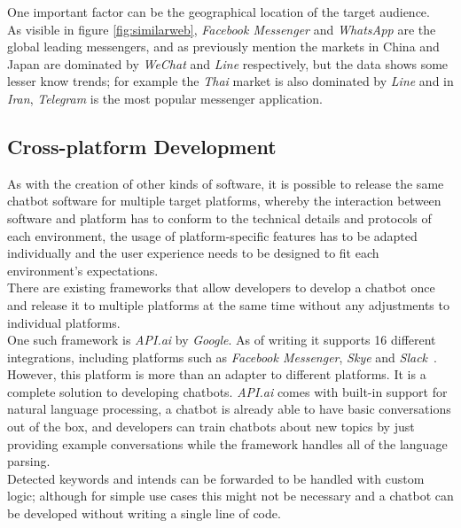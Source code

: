 \label{geography}

One important factor can be the geographical location of the target audience.
\\
As visible in figure \ref{fig:similarweb}, \emph{Facebook Messenger} and \emph{WhatsApp} are the global leading messengers,
and as previously mention the markets in China and Japan are dominated by \emph{WeChat} and \emph{Line} respectively,
but the data shows some lesser know trends; for example the \emph{Thai} market is also dominated by \emph{Line}
and in \emph{Iran}, \emph{Telegram} is the most popular messenger application.


\subsection{Cross-platform Development}
\label{crossplatform}

As with the creation of other kinds of software, it is possible to release the same chatbot software for multiple target platforms,
whereby the interaction between software and platform has to conform to the technical details and protocols of each environment, the usage of platform-specific features has to be adapted individually and the user experience needs to be designed to fit each environment's expectations.
\\

There are existing frameworks that allow developers to develop a chatbot once and release it to multiple platforms at the same time without any adjustments to individual platforms.
\\
One such framework is \emph{API.ai} by \emph{Google}.
As of writing it supports 16 different integrations, including platforms such as \emph{Facebook Messenger}, \emph{Skye} and \emph{Slack}~\cite{apiai}.
However, this platform is more than an adapter to different platforms.
It is a complete solution to developing chatbots.
\emph{API.ai} comes with built-in support for natural language processing,
a chatbot is already able to have basic conversations out of the box,
and developers can train chatbots about new topics by just providing example conversations while the framework handles all of the language parsing.
\\
Detected keywords and intends can be forwarded to be handled with custom logic;
although for simple use cases this might not be necessary and a chatbot can be developed without writing a single line of code.
\\

